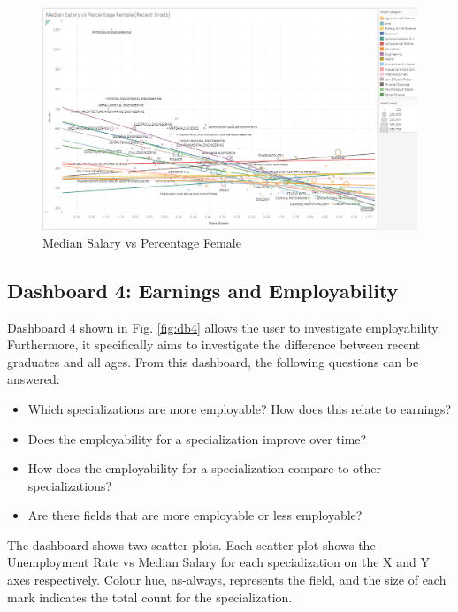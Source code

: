 \documentclass[sigchi]{acmart}
\begin{document}
  \begin{figure}[thpb]
  \includegraphics[width=1.0\textwidth]{SP1.png}
     \caption{Median Salary vs Percentage Female}
         \label{fig:sp1}
  \end{figure}


\subsection{Dashboard 4: Earnings and Employability}
\label{sec:db4}

Dashboard 4 shown in Fig. \ref{fig:db4} allows the user to investigate employability. Furthermore, it specifically aims to investigate the difference between recent graduates and all ages. From this dashboard, the following questions can be answered:
\begin{itemize}
\item{Which specializations are more employable? How does this relate to earnings?}
\item{Does the employability for a specialization improve over time?}
\item{How does the employability for a specialization compare to other specializations?}
\item{Are there fields that are more employable or less employable?}
\end{itemize}
The dashboard shows two scatter plots. Each scatter plot shows the Unemployment Rate vs Median Salary for each specialization on the X and Y axes respectively. Colour hue, as-always, represents the field, and the size of each mark indicates the total count for the specialization. 
\end{document}
